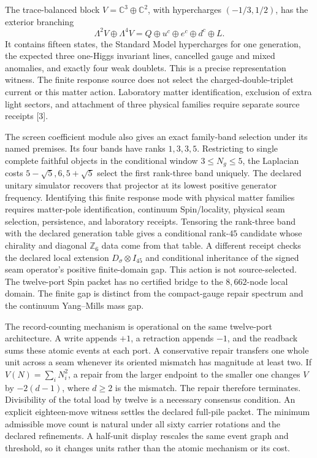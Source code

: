 \documentclass[10pt]{article}
\begin{document}
The trace-balanced block \(V=\mathbb C^3\oplus\mathbb C^2\), with
hypercharges \((-1/3,1/2)\), has the exterior branching
\[
 \Lambda^2V\oplus\Lambda^4V
 =Q\oplus u^c\oplus e^c\oplus d^c\oplus L .
\]
It contains fifteen states, the Standard Model hypercharges for one
generation, the expected three one-Higgs invariant lines, cancelled gauge and
mixed anomalies, and exactly four weak doublets. This is a precise
representation witness. The finite response source does not select the
charged-double-triplet current or this matter action. Laboratory matter
identification, exclusion of extra light sectors, and attachment of three
physical families require separate source receipts [3].

The screen coefficient module also gives an exact family-band selection under
its named premises. Its four bands have ranks \(1,3,3,5\). Restricting to
single complete faithful objects in the conditional window
\(3\leq N_g\leq5\), the Laplacian costs
\(5-\sqrt5,6,5+\sqrt5\) select the first rank-three band uniquely. The declared
unitary simulator recovers that projector at its lowest positive generator
frequency. Identifying this finite response mode with physical matter
families requires matter-pole identification, continuum Spin/locality,
physical seam selection, persistence, and laboratory receipts. Tensoring the
rank-three band with the declared generation table gives a conditional
rank-\(45\) candidate whose chirality and diagonal \(\mathbb Z_6\) data come
from that table. A different receipt checks the declared local extension
\(D_\sigma\otimes I_{45}\) and conditional inheritance of the signed seam
operator's positive finite-domain gap. This action is not source-selected.
The twelve-port Spin packet has no certified bridge to the \(8{,}662\)-node
local domain. The finite gap is distinct from the compact-gauge repair
spectrum and the continuum Yang--Mills mass gap.

The record-counting mechanism is operational on the same twelve-port
architecture. A write appends \(+1\), a retraction appends \(-1\), and the
readback sums these atomic events at each port. A conservative repair transfers
one whole unit across a seam whenever its oriented mismatch has magnitude at
least two. If \(V(N)=\sum_iN_i^2\), a repair from the larger endpoint to the
smaller one changes \(V\) by \(-2(d-1)\), where \(d\geq2\) is the mismatch.
The repair therefore terminates. Divisibility of the total load by twelve is a
necessary consensus condition. An explicit eighteen-move witness settles the
declared full-pile packet. The minimum admissible move count is natural under
all sixty carrier rotations and the declared refinements. A half-unit display
rescales the same event graph and threshold, so it changes units rather than
the atomic mechanism or its cost.
\end{document}
